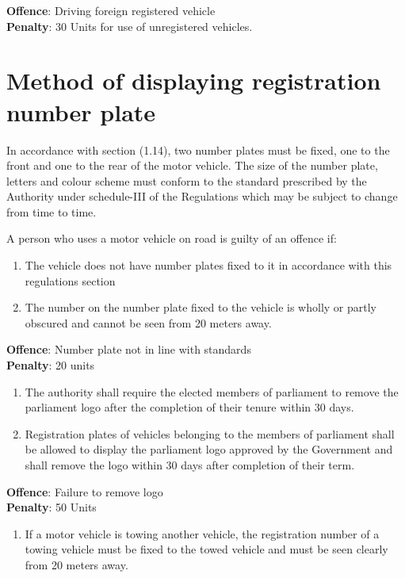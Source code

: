 \documentclass[
]{book}
\providecommand{\tightlist}{%
  \setlength{\itemsep}{0pt}\setlength{\parskip}{0pt}}
\begin{document}
\textbf{Offence}: Driving foreign registered vehicle\\
\textbf{Penalty}: 30 Units for use of unregistered vehicles.

\hypertarget{method-of-displaying-registration-number-plate}{%
\section{Method of displaying registration number plate}\label{method-of-displaying-registration-number-plate}}

In accordance with section (1.14), two number plates must be fixed, one to the front and one to the rear of the motor vehicle. The size of the number plate, letters and colour scheme must conform to the standard prescribed by the Authority under schedule-III of the Regulations which may be subject to change from time to time.

A person who uses a motor vehicle on road is guilty of an offence if:

\begin{enumerate}
\def\labelenumi{\alph{enumi}.}
\tightlist
\item
  The vehicle does not have number plates fixed to it in accordance with this regulations section
\item
  The number on the number plate fixed to the vehicle is wholly or partly obscured and cannot be seen from 20 meters away.
\end{enumerate}

\textbf{Offence}: Number plate not in line with standards\\
\textbf{Penalty}: 20 units

\begin{enumerate}
\def\labelenumi{\alph{enumi}.}
\setcounter{enumi}{2}
\tightlist
\item
  The authority shall require the elected members of parliament to remove the parliament logo after the completion of their tenure within 30 days.
\item
  Registration plates of vehicles belonging to the members of parliament shall be allowed to display the parliament logo approved by the Government and shall remove the logo within 30 days after completion of their term.
\end{enumerate}

\textbf{Offence}: Failure to remove logo\\
\textbf{Penalty}: 50 Units

\begin{enumerate}
\def\labelenumi{\alph{enumi}.}
\setcounter{enumi}{4}
\tightlist
\item
  If a motor vehicle is towing another vehicle, the registration number of a towing vehicle must be fixed to the towed vehicle and must be seen clearly from 20 meters away.
\end{enumerate}
\end{document}
